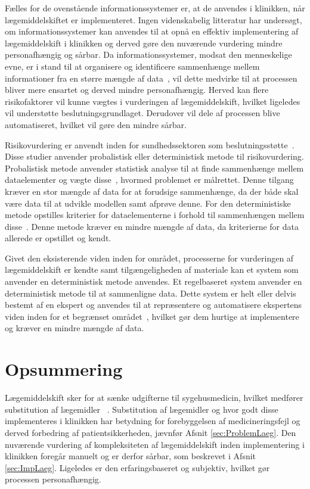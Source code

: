 Fælles for de ovenstående informationssystemer er, at de anvendes i klinikken, når lægemiddelskiftet er implementeret. Ingen videnskabelig litteratur har undersøgt, om informationssystemer kan anvendes til at opnå en effektiv implementering af lægemiddelskift i klinikken og derved gøre den nuværende vurdering mindre personafhængig og sårbar. Da informationssystemer, modsat den menneskelige evne, er i stand til at organisere og identificere sammenhænge mellem informationer fra en større mængde af data~\citep{Agrawal2009}, vil dette medvirke til at processen bliver mere ensartet og derved mindre personafhængig. Herved kan flere risikofaktorer vil kunne vægtes i vurderingen af lægemiddelskift, hvilket ligeledes vil understøtte beslutningsgrundlaget. Derudover vil dele af processen blive automatiseret, hvilket vil gøre den mindre sårbar.

Risikovurdering er anvendt inden for sundhedssektoren som beslutningsstøtte~\citep{Geissert2018, Boyko1990, Rawshani2018}. Disse studier anvender probalistisk eller deterministisk metode til risikovurdering. Probalistisk metode anvender statistisk analyse til at finde sammenhænge mellem dataelementer og vægte disse~\citep{Campbell2008,Bruce2007}, hvormed problemet er målrettet. Denne tilgang kræver en stor mængde af data for at forudsige sammenhænge, da der både skal være data til at udvikle modellen samt afprøve denne. For den deterministiske metode opstilles kriterier for dataelementerne i forhold til sammenhængen mellem disse~\citep{Campbell2008}. Denne metode kræver en mindre mængde af data, da kriterierne for data allerede er opstillet og kendt. 

Givet den eksisterende viden inden for området, processerne for vurderingen af lægemiddelskift er kendte samt tilgængeligheden af materiale kan et system som anvender en deterministisk metode anvendes. Et regelbaseret system anvender en deterministisk metode til at sammenligne data. Dette system er helt eller delvis bestemt af en ekspert og anvendes til at repræsentere og automatisere ekspertens viden inden for et begrænset området~\citep{Crina2008}, hvilket gør dem hurtige at implementere og kræver en mindre mængde af data. 

\section{Opsummering}
Lægemiddelskift sker for at sænke udgifterne til sygehusmedicin, hvilket medfører substitution af lægemidler ~\citep{Ess2003, Johnston2011}. Substitution af lægemidler og hvor godt disse implementeres i klinikken har betydning for forebyggelsen af medicineringsfejl og derved forbedring af patientsikkerheden, jævnfør Afsnit \ref{sec:ProblemLaeg}. Den nuværende vurdering af kompleksiteten af lægemiddelskift inden implementering i klinikken foregår manuelt og er derfor sårbar, som beskrevet i Afsnit \ref{sec:ImpLaeg}. Ligeledes er den erfaringsbaseret og subjektiv, hvilket gør processen personafhængig.

